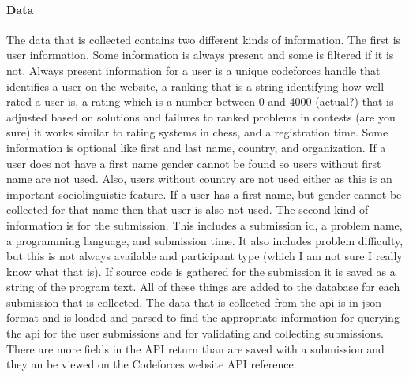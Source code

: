 \documentclass{article}
\begin{document}
\paragraph{Data}
The data that is collected contains two different kinds of information. The first is user information. Some information is always present and some is filtered if it is not. Always present information for a user is a unique codeforces handle that identifies a user on the website, a ranking that is a string identifying how well rated a user is, a rating which is a number between 0 and 4000 (actual?) that is adjusted based on solutions and failures to ranked problems in contests (are you sure) it works similar to rating systems in chess, and a registration time. Some information is optional like first and last name, country, and organization. If a user does not have a first name gender cannot be found so users without first name are not used. Also, users without country are not used either as this is an important sociolinguistic feature. If a user has a first name, but gender cannot be collected for that name then that user is also not used. The second kind of information is for the submission. This includes a submission id, a problem name, a programming language, and submission time. It also includes problem difficulty, but this is not always available and participant type (which I am not sure I really know what that is). If source code is gathered for the submission it is saved as a string of the program text. All of these things are added to the database for each submission that is collected. The data that is collected from the api is in json format and is loaded and parsed to find the appropriate information for querying the api for the user submissions and for validating and collecting submissions. There are more fields in the API return than are saved with a submission and they an be viewed on the Codeforces website API reference.
\end{document}
